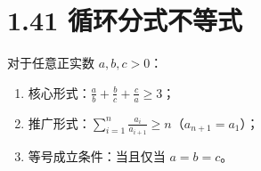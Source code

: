 \documentclass{article}
\begin{document}
\section*{1.41 循环分式不等式}
对于任意正实数 \( a,b,c>0 \)：
\begin{enumerate}
    \item 核心形式：\( \frac{a}{b}+\frac{b}{c}+\frac{c}{a} \geq 3 \)；
    \item 推广形式：\( \sum_{i=1}^n \frac{a_i}{a_{i+1}} \geq n \)（\( a_{n+1}=a_1 \)）；
    \item 等号成立条件：当且仅当 \( a=b=c \)。
\end{enumerate}
\end{document}
